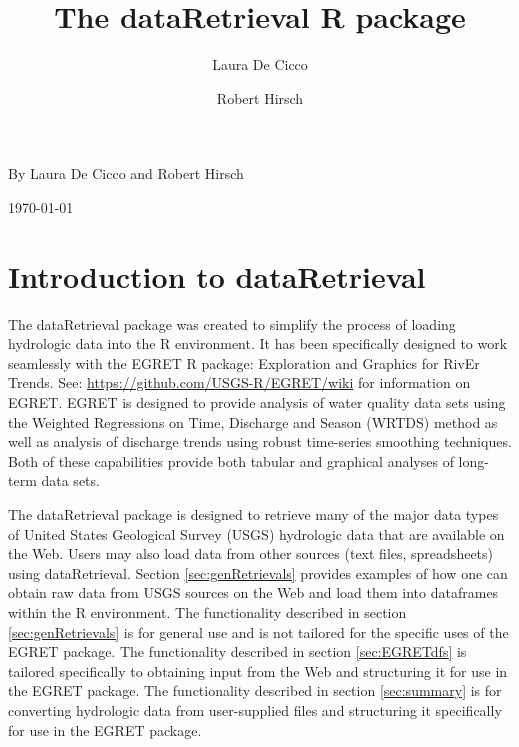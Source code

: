 \documentclass[a4paper,11pt]{article}\usepackage[]{graphicx}\usepackage[]{color}
\begin{document}
\renewenvironment{knitrout}{\begin{singlespace}}{\end{singlespace}}
\renewcommand*\listfigurename{Figures}

\renewcommand*\listtablename{Tables}


\title{The dataRetrieval R package}
\author[1]{Laura De Cicco}
\author[1]{Robert Hirsch}





\noindent\textsf{By Laura De Cicco and Robert Hirsch}

\noindent\textsf{\today}

% 

\tableofcontents
\listoffigures
\listoftables

\newpage

\section{Introduction to dataRetrieval}
The dataRetrieval package was created to simplify the process of loading hydrologic data into the R environment. It has been specifically designed to work seamlessly with the EGRET R package: Exploration and Graphics for RivEr Trends. See: \url{https://github.com/USGS-R/EGRET/wiki} for information on EGRET. EGRET is designed to provide analysis of water quality data sets using the Weighted Regressions on Time, Discharge and Season (WRTDS) method as well as analysis of discharge trends using robust time-series smoothing techniques.  Both of these capabilities provide both tabular and graphical analyses of long-term data sets.


The dataRetrieval package is designed to retrieve many of the major data types of United States Geological Survey (USGS) hydrologic data that are available on the Web. Users may also load data from other sources (text files, spreadsheets) using dataRetrieval.  Section \ref{sec:genRetrievals} provides examples of how one can obtain raw data from USGS sources on the Web and load them into dataframes within the R environment.  The functionality described in section \ref{sec:genRetrievals} is for general use and is not tailored for the specific uses of the EGRET package.  The functionality described in section \ref{sec:EGRETdfs} is tailored specifically to obtaining input from the Web and structuring it for use in the EGRET package.  The functionality described in section \ref{sec:summary} is for converting hydrologic data from user-supplied files and structuring it specifically for use in the EGRET package.
\end{document}
